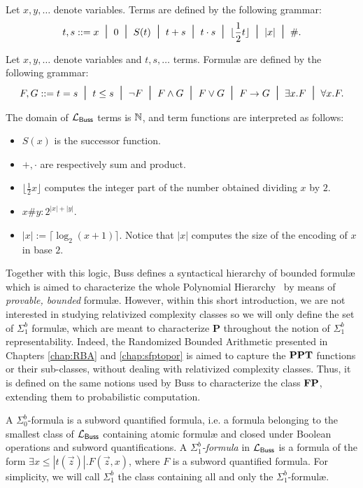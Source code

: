 \begin{defn}[Terms]
  \label{def:lbussterms}
Let $x,y,\dots$ denote variables.
Terms are defined by the following grammar:
$$
t,s ::= x \; \; \mbox{\Large{$\mid$}}\;\; 0 \; \; \mbox{\Large{$\mid$}}\;\; S(t)
\; \; \mbox{\Large{$\mid$}}\;\; t + s \; \; \mbox{\Large{$\mid$}}\;\; t \cdot s \; \; \mbox{\Large{$\mid$}}\;\; \lfloor \frac 1 2 t\rfloor \; \; \mbox{\Large{$\mid$}}\;\; |x|\; \; \mbox{\Large{$\mid$}}\;\; \#.
$$
\end{defn}


\begin{defn}[Formul\ae{}]
  \label{def:lbussform}
Let $x,y,\dots$ denote variables and
$t,s,\dots$ terms.
Formul\ae{} are defined by the following
grammar:
$$
F, G ::= t=s \; \; \mbox{\Large{$\mid$}}\;\; t\le s
\; \; \mbox{\Large{$\mid$}}\;\; \neg F \; \; \mbox{\Large{$\mid$}}\;\; F\wedge G \; \; \mbox{\Large{$\mid$}}\;\; F\vee G
\; \; \mbox{\Large{$\mid$}}\;\; F\rightarrow G \; \; \mbox{\Large{$\mid$}}\;\; \exists x.F \; \; \mbox{\Large{$\mid$}}\;\;
\forall x.F.
$$
\end{defn}

\noindent
The domain of $\mathcal{L}_{\mathsf{Buss}}$ terms is $\mathbb{N}$, and term functions are interpreted as follows:

\begin{itemize}
  \item $S(x)$ is the successor function.
  \item $+, \cdot$ are respectively sum and product.
  \item $\lfloor\frac 1 2 x\rfloor$ computes the integer part of the number obtained dividing $x$ by $2$.
  \item $x\#y:2^{|x|+|y|}$.
  \item $|x|:=\lceil\log_2(x+1)\rceil$. Notice that $|x|$ computes the size of the encoding of $x$ in base $2$.
\end{itemize}

Together with this logic, Buss defines a syntactical hierarchy of bounded formul\ae{} which is aimed to characterize the whole Polynomial Hierarchy~\cite{STOCKMEYER19761} by means of \emph{provable, bounded} formul\ae{}. However, within this short introduction, we are not interested in studying relativized complexity classes so we will only define the set of $\Sigma^b_1$ formul\ae{}, which are meant to characterize $\mathbf P$ throughout the notion of $\Sigma^b_1$ representability. Indeed, the Randomized Bounded Arithmetic presented in Chapters \ref{chap:RBA} and \ref{chap:sfptopor} is aimed to capture the $\mathbf{PPT}$ functions or their sub-classes, without dealing
with relativized complexity classes. Thus, it is defined on the same notions used by Buss to characterize the class $\mathbf{FP}$, extending them to probabilistic computation.

\begin{defn}\label{df:Sigmab1}
A $\Sigma^b_0$-formula  is a subword quantified formula,
i.e. a formula belonging to the smallest
class of $\mathcal{L}_{\mathsf{Buss}}$ containing atomic
formul\ae{} and closed under Boolean operations
and subword quantifications.
A \emph{$\Sigma^b_1$-formula}
in $\mathcal{L}_{\mathsf{Buss}}$ is a formula of the form
$\exists x\le |t(\vec{z})|.
F(\vec{z},x)$,
where $F$ is a subword quantified formula. For simplicity, we will call $\Sigma^b_1$ the class
containing all and only the $\Sigma^b_1$-formul\ae{}.
\end{defn}

